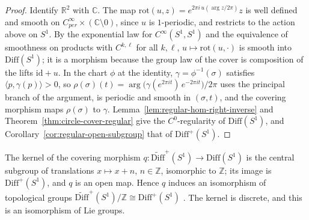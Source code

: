 \begin{proof}
  \leanok
  Identify $\mathbb R^2$ with $\mathbb C$. The map
  $\mathrm{rot}(u, z) = e^{2\pi i\,u(\arg z/2\pi)} z$ is well defined and smooth on
  $C^\infty_{per} \times (\mathbb C \setminus 0)$, since $u$ is $1$-periodic, and restricts to the
  action above on $S^1$. By the exponential law for $C^\infty(S^1, S^1)$ and the equivalence of
  smoothness on products with $C^{k, \ell}$ for all $k, \ell$, $u \mapsto \mathrm{rot}(u, \cdot)$ is
  smooth into $\mathrm{Diff}(S^1)$; it is a morphism because the group law of the cover is
  composition of the lifts $\mathrm{id} + u$. In the chart $\phi$ at the identity, $\gamma =
  \phi^{-1}(\sigma)$ satisfies $\langle p, \gamma(p)\rangle > 0$, so
  $\rho(\sigma)(t) = \arg\big(\gamma(e^{2\pi i t})\,e^{-2\pi i t}\big)/2\pi$ uses the principal
  branch of the argument, is periodic and smooth in $(\sigma, t)$, and the covering morphism maps
  $\rho(\sigma)$ to $\gamma$. Lemma~\ref{lem:regular-hom-right-inverse} and
  Theorem~\ref{thm:circle-cover-regular} give the $C^0$-regularity of $\mathrm{Diff}(S^1)$, and
  Corollary~\ref{cor:regular-open-subgroup} that of $\mathrm{Diff}^+(S^1)$.
\end{proof}

\begin{theorem}
  \label{thm:diff-circle-quotient}
  \leanok
  The kernel of the covering morphism $q \colon \widetilde{\mathrm{Diff}}^+(S^1) \to
  \mathrm{Diff}(S^1)$ is the central subgroup of translations $x \mapsto x + n$, $n \in \mathbb Z$,
  isomorphic to $\mathbb Z$; its image is $\mathrm{Diff}^+(S^1)$, and $q$ is an open map. Hence $q$
  induces an isomorphism of topological groups
  $\widetilde{\mathrm{Diff}}^+(S^1)/\mathbb Z \cong \mathrm{Diff}^+(S^1)$
  \cite[\S 13.3]{GN26}. The kernel is discrete, and this is an isomorphism of Lie groups.
\end{theorem}

